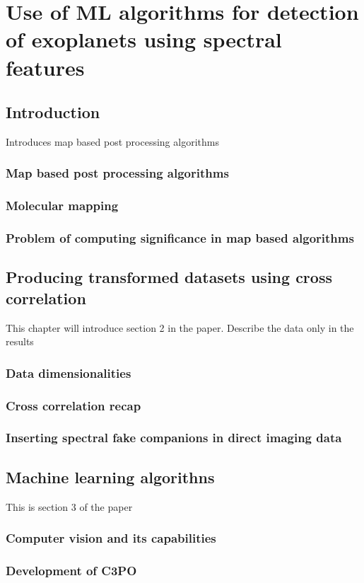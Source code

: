 \part{Use of ML algorithms for detection of exoplanets using spectral features}
\startcontents[chapters]
\printmyminitoc{}
\chapter{Introduction}
Introduces map based post processing algorithms
\section{Map based post processing algorithms}
\section{Molecular mapping }
\section{Problem of computing significance in map based algorithms}

\chapter{Producing transformed datasets using cross correlation }
This chapter will introduce section 2 in the paper. Describe the data only in the results
\section{Data dimensionalities }
\section{Cross correlation recap}
\section{Inserting spectral fake companions in direct imaging data}

\chapter{Machine learning algorithns}
This is section 3 of the paper
\section{Computer vision and its capabilities}
\section{Development of C3PO}
